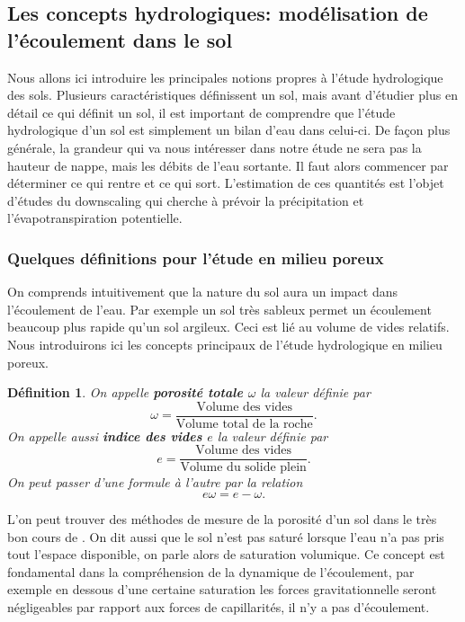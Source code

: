 \documentclass[a4paper,11pt]{article}
\numberwithin{equation}{section}
\newtheorem{definition}{Définition}
\begin{document}
\subsection{Les concepts hydrologiques: modélisation de l'écoulement dans le sol}
\label{hydro}

Nous allons ici introduire les principales notions propres à l'étude hydrologique des sols. Plusieurs caractéristiques définissent un sol, mais avant d'étudier  plus en détail ce qui définit un sol, il est important de comprendre que l'étude hydrologique d'un sol est simplement un bilan d'eau dans celui-ci. De façon plus générale, la grandeur qui va nous intéresser dans notre étude ne sera pas la hauteur de nappe, mais les débits de l'eau sortante.
Il faut alors commencer par déterminer ce qui rentre et ce qui sort. L'estimation de ces quantités est l'objet d'études du downscaling qui cherche à prévoir la précipitation et l'évapotranspiration potentielle.

\subsubsection{Quelques définitions pour l'étude en milieu poreux}
\label{ch: definition milieu poreux}
On comprends intuitivement que la nature du sol aura un impact dans l'écoulement de l'eau. Par exemple un sol très sableux permet un écoulement beaucoup plus rapide qu'un sol argileux. Ceci est lié au volume de vides relatifs. Nous introduirons ici les concepts principaux de l'étude hydrologique en milieu poreux.

\begin{definition}
	\label{def:porosite}
	On appelle \textbf{porosité totale $\omega$} la valeur définie par
	\begin{equation}
		\omega =\frac{\textrm{Volume des vides}}{\textrm{Volume total de la roche}}.
	\end{equation}
	On appelle aussi \textbf{indice des vides $e$} la valeur définie par 
	\begin{equation}
		e=\frac{\textrm{Volume des vides}}{\textrm{Volume du solide plein}}.
	\end{equation}
	On peut passer d'une formule à l'autre par la relation 
	\[e\omega=e-\omega.\]
\end{definition}
L'on peut trouver des méthodes de mesure de la porosité d'un sol dans le très bon cours de \cite{marsily_de1986quantitative}. On dit aussi que le sol n'est pas saturé lorsque l'eau n'a pas pris tout l'espace disponible, on parle alors de saturation volumique. Ce concept est fondamental dans la compréhension de la dynamique de l'écoulement, par exemple en dessous d'une certaine saturation les forces gravitationnelle seront négligeables par rapport aux forces de capillarités, il n'y a pas d'écoulement.
 
\end{document}
